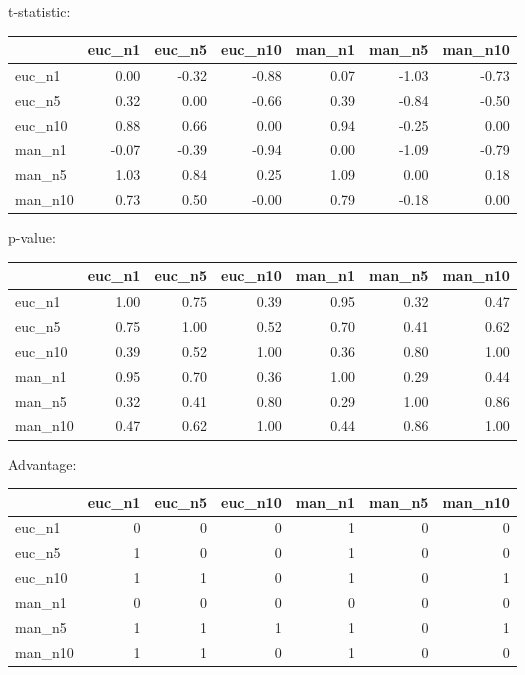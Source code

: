 t-statistic:
 \begin{tabular}{lrrrrrr}
\hline
         &   euc\_n1 &   euc\_n5 &   euc\_n10 &   man\_n1 &   man\_n5 &   man\_n10 \\
\hline
 euc\_n1  &     0.00 &    -0.32 &     -0.88 &     0.07 &    -1.03 &     -0.73 \\
 euc\_n5  &     0.32 &     0.00 &     -0.66 &     0.39 &    -0.84 &     -0.50 \\
 euc\_n10 &     0.88 &     0.66 &      0.00 &     0.94 &    -0.25 &      0.00 \\
 man\_n1  &    -0.07 &    -0.39 &     -0.94 &     0.00 &    -1.09 &     -0.79 \\
 man\_n5  &     1.03 &     0.84 &      0.25 &     1.09 &     0.00 &      0.18 \\
 man\_n10 &     0.73 &     0.50 &     -0.00 &     0.79 &    -0.18 &      0.00 \\
\hline
\end{tabular} 

p-value:
 \begin{tabular}{lrrrrrr}
\hline
         &   euc\_n1 &   euc\_n5 &   euc\_n10 &   man\_n1 &   man\_n5 &   man\_n10 \\
\hline
 euc\_n1  &     1.00 &     0.75 &      0.39 &     0.95 &     0.32 &      0.47 \\
 euc\_n5  &     0.75 &     1.00 &      0.52 &     0.70 &     0.41 &      0.62 \\
 euc\_n10 &     0.39 &     0.52 &      1.00 &     0.36 &     0.80 &      1.00 \\
 man\_n1  &     0.95 &     0.70 &      0.36 &     1.00 &     0.29 &      0.44 \\
 man\_n5  &     0.32 &     0.41 &      0.80 &     0.29 &     1.00 &      0.86 \\
 man\_n10 &     0.47 &     0.62 &      1.00 &     0.44 &     0.86 &      1.00 \\
\hline
\end{tabular} 

Advantage:
 \begin{tabular}{lrrrrrr}
\hline
         &   euc\_n1 &   euc\_n5 &   euc\_n10 &   man\_n1 &   man\_n5 &   man\_n10 \\
\hline
 euc\_n1  &        0 &        0 &         0 &        1 &        0 &         0 \\
 euc\_n5  &        1 &        0 &         0 &        1 &        0 &         0 \\
 euc\_n10 &        1 &        1 &         0 &        1 &        0 &         1 \\
 man\_n1  &        0 &        0 &         0 &        0 &        0 &         0 \\
 man\_n5  &        1 &        1 &         1 &        1 &        0 &         1 \\
 man\_n10 &        1 &        1 &         0 &        1 &        0 &         0 \\
\hline
\end{tabular} 

